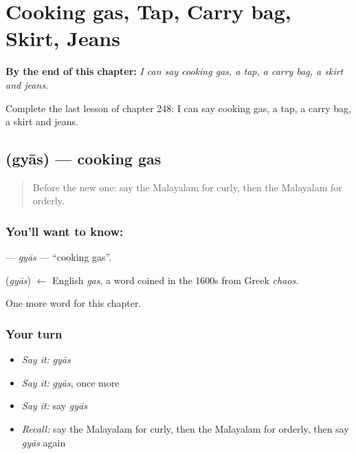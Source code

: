 
\chapter{Cooking gas, Tap, Carry bag, Skirt, Jeans}
\label{ch:ml-cooking-gas-tap-carry-bag-skirt-jeans}

\begin{chapteropening}
\textbf{By the end of this chapter:} \emph{I can say cooking gas, a tap, a carry bag, a skirt and jeans.}

Complete the last lesson of chapter 248: I can say cooking gas, a tap, a carry bag, a skirt and jeans.
\end{chapteropening}

\section[\texorpdfstring{\ml{ഗ്യാസ്} (gyās)}{ഗ്യാസ് (gyās)}]{ (gyās) — cooking gas}

\label{lesson:ML-C248-gyas}



\begin{quote}
Before the new one: say the Malayalam for curly, then the Malayalam for orderly.
\end{quote}

\subsection*{You'll want to know: }
\textbf{} — \emph{gyās} — \textquotedblleft{}cooking gas\textquotedblright{}.

\begin{cousinweb}
\textbf{} (\emph{gyās}) $\leftarrow$ English \emph{gas}, a word coined in the 1600s from Greek \emph{chaos}.
\end{cousinweb}

\begin{grammarlens}[title={What you've built}]
One more word for this chapter.
\end{grammarlens}

\subsection*{Your turn}
\begin{itemize}
\raggedright
  \item \emph{Say it:} \emph{gyās}
  \item \emph{Say it:} \emph{gyās}, once more
  \item \emph{Say it:} say \emph{gyās}
  \item \emph{Recall:} say the Malayalam for curly, then the Malayalam for orderly, then say \emph{gyās} again
\end{itemize}


